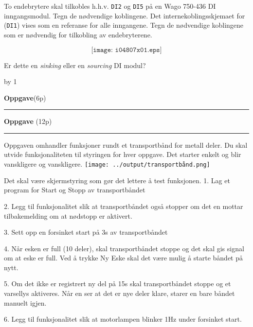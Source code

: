 \documentclass[12pt,a4paper]{article}
\def\oppgave{
            \advance\questnum by 1
	    \ifthenelse{\questnum>0\AND \questnum<9}
	    {
                \vskip 1cm
		\textbf{Oppgave}\hskip 5pt\the\questnum \hfill \hfill(6p)
		\vskip 3pt
		\hrule
	\vskip 0.5cm}
	{
                \vskip 1cm
		\textbf{Oppgave}\hskip 5pt \the\questnum \hfill \hfill(12p)
		\vskip 3pt \hrule \vskip 0.5cm }

		}
\begin{document}
To endebrytere skal tilkobles h.h.v. \texttt{DI2} og \texttt{DI5} på en Wago 750-436 DI inngangsmodul. Tegn de nødvendige koblingene. Det internekoblingsskjemaet for (\texttt{DI1}) vises som en referanse for alle inngangene.
Tegn de nødvendige koblingene som er nødvendig for tilkobling av endebryterene.  


$$\texttt{[image: i04807x01.eps]}$$

Er dette en \textit{sinking} eller en \textit{sourcing} DI modul?
\oppgave{}

Oppgaven omhandler funksjoner rundt et transportbånd for metall deler.
Du skal utvide funksjonaliteten til styringen for hver oppgave. Det
starter enkelt og blir vanskligere og vanskligere. 
\vskip 1cm
\texttt{[image: ../output/transportbånd.png]}

\vskip 1cm
Det skal være skjermstyring som gør det lettere å test funksjonen. 
\vskip 10pt
1. Lag et program for Start og Stopp av transportbåndet 

2. Legg til funksjonalitet slik at transportbåndet også stopper om
det en mottar tilbakemelding om at nødstopp er aktivert. 

3. Sett opp en forsinket start på 3s av transportbåndet 

4. Når esken er full (10 deler), skal transportbåndet stoppe og det
skal gis signal om at eske er full. Ved å trykke Ny Eske skal det
være mulig å starte båndet på nytt. 

5. Om det ikke er registrert ny del på 15s skal transportbåndet stoppe
og et varsellys aktiveres. Når en ser at det er nye deler klare, starer
en bare båndet manuelt igjen. 

6. Legg til funksjonalitet slik at motorlampen blinker 1Hz under forsinket
start. 
\end{document}
